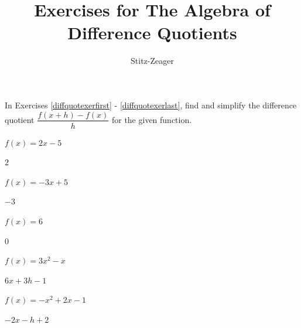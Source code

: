 \documentclass{ximera}
\begin{document}
	\author{Stitz-Zeager}
	\title{Exercises for The Algebra of Difference Quotients}
    \begin{abstract}\end{abstract}
    \maketitle



\label{ExercisesforFunctionArithmetic}

\begin{question}
    
In Exercises \ref{diffquotexerfirst} - \ref{diffquotexerlast}, find and simplify the difference quotient $\dfrac{f(x+h) - f(x)}{h}$ for the given function.

\begin{problem}\label{diffquotexerfirst}
$f(x) = 2x - 5$

\begin{solution}
    $2$
\end{solution}
\end{problem}
 
\begin{problem}
$f(x) = -3x + 5$   

\begin{solution}
    $-3$
\end{solution}
\end{problem} 

\begin{problem}
$f(x) = 6$   

\begin{solution}
    $0$
\end{solution}
\end{problem}  

\begin{problem}
$f(x) = 3x^2 - x$   

\begin{solution}
    $6x+3h-1$
\end{solution}
\end{problem} 

\begin{problem}
$f(x) = -x^2 + 2x - 1$   

\begin{solution}
    $-2x-h+2$
\end{solution}
\end{problem} 


\end{question}
\end{document}
